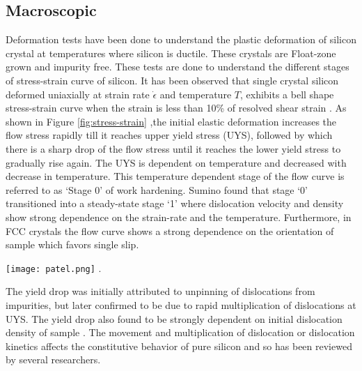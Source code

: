 \subsection{Macroscopic}
Deformation tests have been done \cite{patel1963macroscopic,alexander1969dislocations} to understand the plastic deformation of silicon crystal at temperatures where silicon is ductile. These crystals are Float-zone grown and impurity free. These tests are done to understand the different stages of stress-strain curve of silicon. It has been observed that single crystal silicon deformed uniaxially at strain rate $\dot{\epsilon}$ and temperature $T$, exhibits a bell shape stress-strain curve when the strain is less than 10\% of resolved shear strain \cite{patel1963macroscopic}. As shown in Figure \ref{fig:stress-strain} ,the initial elastic deformation increases the flow stress rapidly till it reaches upper yield stress (UYS), followed by which there is a sharp drop of the flow stress until it reaches the lower yield stress to gradually rise again. The UYS is dependent on temperature and decreased with decrease in temperature. This temperature dependent stage of the flow curve is referred to as ‘Stage 0’ of work hardening. Sumino \cite{kojima1971strain} found that stage ‘0’ transitioned into a steady-state stage ‘1’ where dislocation velocity and density show strong dependence on the strain-rate and the temperature. Furthermore, in FCC crystals the flow curve shows a strong dependence on the orientation of sample which favors single slip. 

\noindent
\begin{minipage}[c]{\textwidth}
\centering
       \captionsetup{type=figure}
       \texttt{[image: patel.png]}
      .
        \label{fig:stress-strain}
\end{minipage}

The yield drop was initially attributed to unpinning of dislocations from impurities, but later confirmed to be due to rapid multiplication of dislocations at UYS. The yield drop also found to be strongly dependent on initial dislocation density of sample \cite{alexander1969dislocations, patel1963macroscopic}. The movement and multiplication of dislocation or dislocation kinetics affects the constitutive behavior of pure silicon and so has been reviewed by several researchers.

